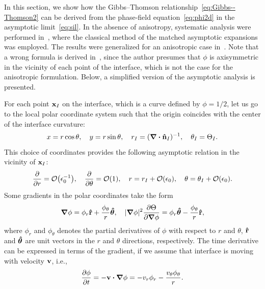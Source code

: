 \documentclass{article}
\begin{document}
In this section, we show how the Gibbs--Thomson relationship~\eqref{eq:Gibbs--Thomson2}
can be derived from the phase-field equation~\eqref{eq:phi2d} in the asymptotic limit~\eqref{eq:sil}.
In the absence of anisotropy, systematic analysis were performed in~\cite{caginalp1986analysis},
where the classical method of the matched asymptotic expansions was employed.
The results were generalized for an anisotropic case in~\cite{mcfadden1993phase}.
Note that a wrong formula is derived in~\cite{kobayashi1993modeling},
since the author presumes that $\phi$ is axisymmetric in the vicinity of each point of the interface,
which is not the case for the anisotropic formulation.
Below, a simplified version of the asymptotic analysis is presented.

For each point $\vb{x}_I$ on the interface, which is a curve defined by $\phi=1/2$,
let us go to the local polar coordinate system
such that the origin coincides with the center of the interface curvature:
\begin{equation}\label{eq:polar}
    x = r\cos\theta, \quad y = r\sin\theta, \quad r_I = (\div\vu{n}_I)^{-1}, \quad \theta_I = \Theta_I.
\end{equation}
This choice of coordinates provides the following asymptotic relation in the vicinity of $\vb{x}_I$:
\begin{equation}\label{eq:polar_asymptotics}
    \pdv{r} = \order{\epsilon_0^{-1}}, \quad \pdv{\theta} = \order{1}, \quad
    r = r_I + \order{\epsilon_0}, \quad \theta = \theta_I + \order{\epsilon_0}.
\end{equation}
Some gradients in the polar coordinates take the form
\begin{equation}\label{eq:polar_gradients}
    \grad\phi = \phi_r\vu{r} + \frac{\phi_\theta}{r}\vu*\theta, \quad
    |\grad\phi|^2\pdv{\Theta}{\grad\phi} = \phi_r\vu*\theta - \frac{\phi_\theta}{r}\vu{r},
\end{equation}
where $\phi_r$ and $\phi_\theta$ denotes the partial derivatives of $\phi$ with respect to $r$ and $\theta$,
$\vu{r}$ and $\vu*\theta$ are unit vectors in the $r$ and $\theta$ directions, respectively.
The time derivative can be expressed in terms of the gradient,
if we assume that interface is moving with velocity $\vb{v}$, i.e.,
\begin{equation}\label{eq:polar_velocity}
    \pdv{\phi}{t} = -\vb{v}\vdot\grad\phi = -v_r\phi_r - \frac{v_\theta\phi_\theta}{r}.
\end{equation}
\end{document}
